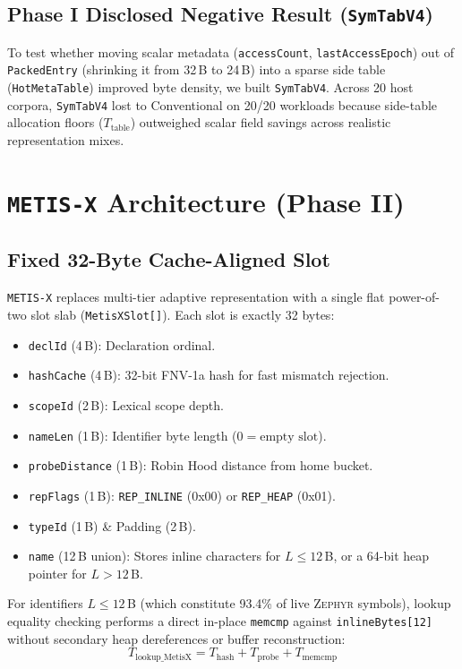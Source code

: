 \documentclass[conference]{IEEEtran}
\begin{document}
\subsection{Phase I Disclosed Negative Result (\texttt{SymTabV4})}
To test whether moving scalar metadata (\texttt{accessCount}, \texttt{lastAccessEpoch}) out of \texttt{PackedEntry} (shrinking it from 32\,B to 24\,B) into a sparse side table (\texttt{HotMetaTable}) improved byte density, we built \texttt{SymTabV4}. Across 20 host corpora, \texttt{SymTabV4} lost to Conventional on 20/20 workloads because side-table allocation floors ($T_{\text{table}}$) outweighed scalar field savings across realistic representation mixes.

\section{\texttt{METIS-X} Architecture (Phase II)}

\subsection{Fixed 32-Byte Cache-Aligned Slot}
\texttt{METIS-X} replaces multi-tier adaptive representation with a single flat power-of-two slot slab (\texttt{MetisXSlot[]}). Each slot is exactly 32 bytes:
\begin{itemize}
    \item \texttt{declId} (4\,B): Declaration ordinal.
    \item \texttt{hashCache} (4\,B): 32-bit FNV-1a hash for fast mismatch rejection.
    \item \texttt{scopeId} (2\,B): Lexical scope depth.
    \item \texttt{nameLen} (1\,B): Identifier byte length ($0 = \text{empty slot}$).
    \item \texttt{probeDistance} (1\,B): Robin Hood distance from home bucket.
    \item \texttt{repFlags} (1\,B): \texttt{REP\_INLINE} (0x00) or \texttt{REP\_HEAP} (0x01).
    \item \texttt{typeId} (1\,B) \& Padding (2\,B).
    \item \texttt{name} (12\,B union): Stores inline characters for $L \le 12$\,B, or a 64-bit heap pointer for $L > 12$\,B.
\end{itemize}

For identifiers $L \le 12$\,B (which constitute 93.4\% of live \textsc{Zephyr} symbols), lookup equality checking performs a direct in-place \texttt{memcmp} against \texttt{inlineBytes[12]} without secondary heap dereferences or buffer reconstruction:
\begin{equation}
T_{\text{lookup\_MetisX}} = T_{\text{hash}} + T_{\text{probe}} + T_{\text{memcmp}}
\end{equation}
\end{document}
